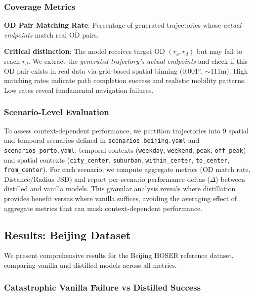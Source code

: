 \subsubsection{Coverage Metrics}

\textbf{OD Pair Matching Rate}: Percentage of generated trajectories whose \emph{actual endpoints} match real OD pairs.

\textbf{Critical distinction}: The model receives target OD $(r_o, r_d)$ but may fail to reach $r_d$. We extract the \emph{generated trajectory's actual endpoints} and check if this OD pair exists in real data via grid-based spatial binning (0.001°, $\sim$111m). High matching rates indicate path completion success and realistic mobility patterns. Low rates reveal fundamental navigation failures.

\subsubsection{Scenario-Level Evaluation}

To assess context-dependent performance, we partition trajectories into 9 spatial and temporal scenarios defined in \texttt{scenarios\_beijing.yaml} and \texttt{scenarios\_porto.yaml}: temporal contexts (\texttt{weekday}, \texttt{weekend}, \texttt{peak}, \texttt{off\_peak}) and spatial contexts (\texttt{city\_center}, \texttt{suburban}, \texttt{within\_center}, \texttt{to\_center}, \texttt{from\_center}). For each scenario, we compute aggregate metrics (OD match rate, Distance/Radius JSD) and report per-scenario performance deltas ($\Delta$) between distilled and vanilla models. This granular analysis reveals where distillation provides benefit versus where vanilla suffices, avoiding the averaging effect of aggregate metrics that can mask context-dependent performance.

\subsection{Results: Beijing Dataset}
\label{sec:eval-beijing}

We present comprehensive results for the Beijing HOSER reference dataset, comparing vanilla and distilled models across all metrics.

\subsubsection{Catastrophic Vanilla Failure vs Distilled Success}

